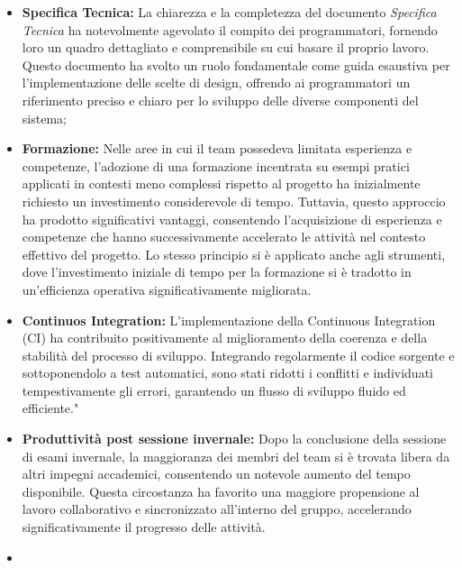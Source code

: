\begin{itemize}
    \item \textbf{Specifica Tecnica:} La chiarezza e la completezza del documento \textit{Specifica Tecnica} ha notevolmente agevolato il compito dei programmatori, fornendo loro un quadro dettagliato e comprensibile su cui basare il proprio lavoro. Questo documento ha svolto un ruolo fondamentale come guida esaustiva per l'implementazione delle scelte di design, offrendo ai programmatori un riferimento preciso e chiaro per lo sviluppo delle diverse componenti del sistema;
    \item \textbf{Formazione:} Nelle aree in cui il team possedeva limitata esperienza e competenze, l'adozione di una formazione incentrata su esempi pratici applicati in contesti meno complessi rispetto al progetto ha inizialmente richiesto un investimento considerevole di tempo. Tuttavia, questo approccio ha prodotto significativi vantaggi, consentendo l'acquisizione di esperienza e competenze che hanno successivamente accelerato le attività nel contesto effettivo del progetto. Lo stesso principio si è applicato anche agli strumenti, dove l'investimento iniziale di tempo per la formazione si è tradotto in un'efficienza operativa significativamente migliorata.
    \item \textbf{Continuos Integration:} L'implementazione della Continuous Integration (CI) ha contribuito positivamente al miglioramento della coerenza e della stabilità del processo di sviluppo. Integrando regolarmente il codice sorgente e sottoponendolo a test automatici, sono stati ridotti i conflitti e individuati tempestivamente gli errori, garantendo un flusso di sviluppo fluido ed efficiente."
    \item \textbf{Produttività post sessione invernale:} Dopo la conclusione della sessione di esami invernale, la maggioranza dei membri del team si è trovata libera da altri impegni accademici, consentendo un notevole aumento del tempo disponibile. Questa circostanza ha favorito una maggiore propensione al lavoro collaborativo e sincronizzato all'interno del gruppo, accelerando significativamente il progresso delle attività.
    \item {}
\end{itemize}
